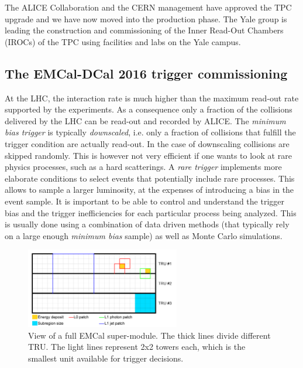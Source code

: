 \documentclass[12pt, a4paper, twoside, titlepage]{article}
\begin{document}
The ALICE Collaboration and the CERN management have approved the TPC upgrade and we have now moved into the production phase.
The Yale group is leading the construction and commissioning of the Inner Read-Out Chambers (IROCs) of the TPC using facilities and labs on the Yale campus.

\subsection{The EMCal-DCal 2016 trigger commissioning}
\label{sect:TriggerCommisioning}
At the LHC, the interaction rate is much higher than the maximum read-out rate supported by the experiments. As a consequence only a fraction of the collisions delivered
by the LHC can be read-out and recorded by ALICE. The \emph{minimum bias trigger} is typically \emph{downscaled}, i.e. only a fraction of collisions
that fulfill the trigger condition are actually read-out. In the case of downscaling collisions are skipped randomly. This is however not very efficient
if one wants to look at rare physics processes, such as a hard scatterings. A \emph{rare trigger} implements more elaborate conditions to select events that 
potentially include rare processes. This allows to sample a larger luminosity, at the expenses of introducing a bias in the event sample. It is important
to be able to control and understand the trigger bias and the trigger inefficiencies for each particular process being analyzed. This is usually done
using a combination of data driven methods (that typically rely on a large enough \emph{minimum bias} sample) as well as Monte Carlo simulations.

\begin{figure}[tb]
\begin{center}
\includegraphics[width=0.6\textwidth]{img/emcaltrigger}
 \caption{View of a full EMCal super-module. The thick lines divide different TRU. The light lines represent 2x2 towers each, which is the smallest unit
available for trigger decisions.} 
 \label{fig:emcaltrigger}
\end{center}
\end{figure}
\end{document}
